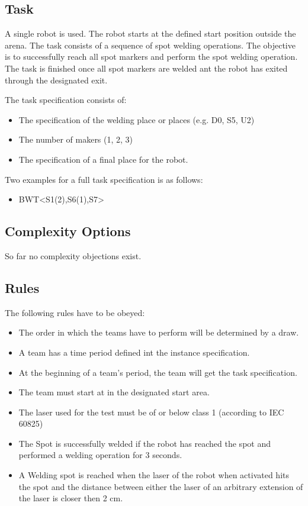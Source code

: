 \subsection{Task}
A single robot is used. The robot starts at the defined start position outside the arena. The task consists of a sequence of spot welding operations. The objective is to successfully reach all spot markers and perform the spot welding operation. The task is finished once all spot markers are welded ant the robot has exited through the designated exit.
\par
The task specification consists of: 
\begin{itemize}
	\item The specification of the welding place or places (e.g. D0, S5, U2)
	\item The number of makers (1, 2, 3)
	\item The specification of a final place for the robot.
\end{itemize}

Two examples for a full task specification is as follows:
\begin{itemize}
	\item BWT\textless S1(2),S6(1),S7\textgreater 
\end{itemize}


\subsection{Complexity Options}

So far no complexity objections exist.

\subsection{Rules}
The following rules have to be obeyed:

\begin{itemize}
\item The order in which the teams have to perform will be determined by a draw.
\item A team has a time period defined int the instance specification.
\item At the beginning of a team’s period, the team will get the task specification. 
\item The team must start at in the designated start area.
\item The laser used for the test must be of or below class 1 (according to IEC 60825)
\item The Spot is successfully welded if the robot has reached the spot and performed a welding operation for 3 seconds.
\item A Welding spot is reached when the laser of the robot when activated hits the spot and the distance between either the laser of an arbitrary extension of the laser is closer then 2 cm.
\end{itemize}


